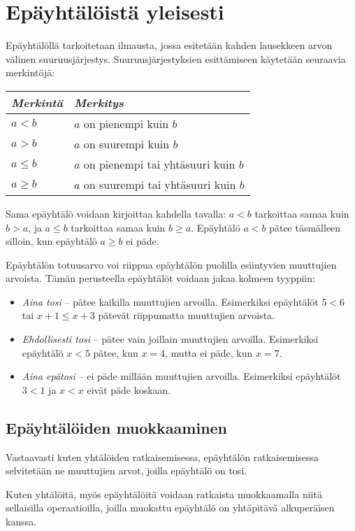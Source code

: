 \section{Epäyhtälöistä yleisesti}
Epäyhtälöllä tarkoitetaan ilmausta, jossa esitetään kahden lausekkeen arvon välinen suuruusjärjestys. Suuruusjärjestyksien esittämiseen käytetään seuraavia merkintöjä:

\begin{center}
\begin{tabular}{l|l}
\emph{Merkintä} & \emph{Merkitys} \\
\hline
$a<b$ &  $a$ on pienempi kuin $b$ \\
$a>b$ & $a$ on suurempi kuin $b$ \\
$a \leq b$ & $a$ on pienempi tai yhtäsuuri kuin $b$ \\
$a \geq b$ & $a$ on suurempi tai yhtäsuuri kuin $b$ \\
\end{tabular}
\end{center}

Sama epäyhtälö voidaan kirjoittaa kahdella tavalla: $a < b$ tarkoittaa samaa kuin $b > a$, ja $a \leq b$ tarkoittaa samaa kuin $b \geq a$. Epäyhtälö $a < b$ pätee täsmälleen silloin, kun epäyhtälö $a \geq b$ ei päde.

Epäyhtälön totuusarvo voi riippua epäyhtälön puolilla esiintyvien muuttujien arvoista. Tämän perusteella epäyhtälöt voidaan jakaa kolmeen tyyppiin:
\begin{itemize}
\item \emph{Aina tosi} -- pätee kaikilla muuttujien arvoilla. Esimerkiksi epäyhtälöt $5 < 6$ tai $x + 1 \leq x + 3$ pätevät riippumatta muuttujien arvoista.
\item \emph{Ehdollisesti tosi} -- pätee vain joillain muuttujien arvoilla. Esimerkiksi epäyhtälö $x < 5$ pätee, kun $x = 4$, mutta ei päde, kun $x = 7$.
\item \emph{Aina epätosi} -- ei päde millään muuttujien arvoilla. Esimerkiksi epäyhtälöt $3 < 1$ ja $x < x$ eivät päde koskaan.
\end{itemize}

\subsection*{Epäyhtälöiden muokkaaminen}
Vastaavasti kuten yhtälöiden ratkaisemisessa, epäyhtälön ratkaisemisessa selvitetään ne muuttujien arvot, joilla epäyhtälö on tosi.

Kuten yhtälöitä, myös epäyhtälöitä voidaan ratkaista muokkaamalla niitä sellaisilla operaatioilla, joilla muokattu epäyhtälö on yhtäpitävä alkuperäisen kanssa.


